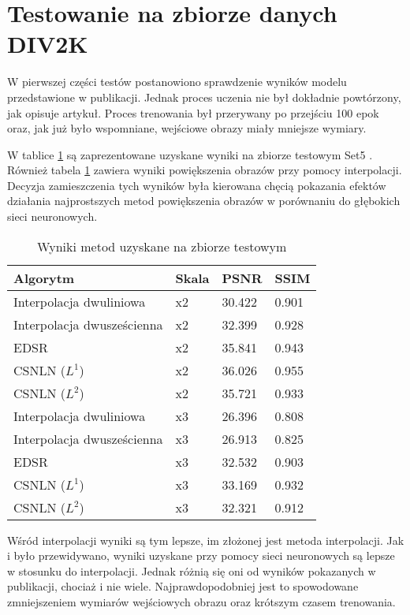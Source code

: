 \documentclass[a4paper,12pt,twoside,openany]{report}
\begin{document}
\section{Testowanie na zbiorze danych DIV2K}  
\label{TestDIV2K}
	W pierwszej części testów postanowiono sprawdzenie wyników modelu przedstawione w publikacji. Jednak proces uczenia nie był dokładnie powtórzony, jak opisuje artykuł. Proces trenowania był przerywany po przejściu 100 epok oraz, jak już było wspomniane, wejściowe obrazy miały mniejsze wymiary.
	
	W tablice \ref{TabelaDIV2k} są zaprezentowane uzyskane wyniki na zbiorze testowym Set5 \cite{Set5}. Również tabela \ref{TabelaDIV2k} zawiera wyniki powiększenia obrazów przy pomocy interpolacji. Decyzja zamieszczenia tych wyników była kierowana chęcią pokazania efektów działania najprostszych metod powiększenia obrazów w porównaniu do głębokich sieci neuronowych.
	
	\begin{table}[!htbp] 
		\centering
	\begin{tabular}{ |p{5cm}||p{2cm}|p{2cm}|p{2cm}|  }
		\hline
		Algorytm & Skala & PSNR &SSIM \\
		\hline
		Interpolacja dwuliniowa                   & x2   &30.422&  0.901\\
		Interpolacja dwusześcienna                & x2   &32.399&   0.928\\
		EDSR                                      &   x2   & 35.841&   0.943\\
		CSNLN  ($L^1$)  						  &   x2  & 36.026& 0.955\\
		CSNLN ($L^2$)  							  &   x2  & 35.721& 0.933\\
		\hline
		Interpolacja dwuliniowa                   &   x3  &26.396&   0.808\\
		Interpolacja dwusześcienna                &   x3  & 26.913   &0.825\\
		EDSR                                      &   x3 & 32.532 &  0.903\\
		CSNLN ($L^1$) 						      &   x3  & 33.169 & 0.932\\
		CSNLN ($L^2$)  							  &   x3  & 32.321 & 0.912\\
		\hline
		
	\end{tabular}
	\caption{Wyniki metod uzyskane na zbiorze testowym}
	\label{TabelaDIV2k}
	\end{table}
	
	Wśród interpolacji wyniki są tym lepsze, im złożonej jest metoda interpolacji. Jak i było przewidywano, wyniki uzyskane przy pomocy sieci neuronowych są lepsze w stosunku do interpolacji. Jednak różnią się oni od wyników pokazanych w publikacji, chociaż i nie wiele. Najprawdopodobniej jest to spowodowane zmniejszeniem wymiarów wejściowych obrazu oraz krótszym czasem trenowania. 
	
\end{document}
